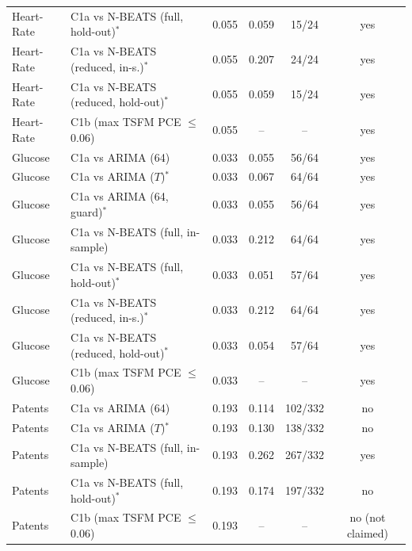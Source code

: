 \begin{tabular}{llcccc}
Heart-Rate & C1a vs N-BEATS (full, hold-out)$^\ast$ & 0.055 & 0.059 & 15/24 & yes \\
Heart-Rate & C1a vs N-BEATS (reduced, in-s.)$^\ast$ & 0.055 & 0.207 & 24/24 & yes \\
Heart-Rate & C1a vs N-BEATS (reduced, hold-out)$^\ast$ & 0.055 & 0.059 & 15/24 & yes \\
Heart-Rate & C1b (max TSFM PCE $\le$ 0.06) & 0.055 & -- & -- & yes \\
Glucose & C1a vs ARIMA (64) & 0.033 & 0.055 & 56/64 & yes \\
Glucose & C1a vs ARIMA ($T$)$^\ast$ & 0.033 & 0.067 & 64/64 & yes \\
Glucose & C1a vs ARIMA (64, guard)$^\ast$ & 0.033 & 0.055 & 56/64 & yes \\
Glucose & C1a vs N-BEATS (full, in-sample) & 0.033 & 0.212 & 64/64 & yes \\
Glucose & C1a vs N-BEATS (full, hold-out)$^\ast$ & 0.033 & 0.051 & 57/64 & yes \\
Glucose & C1a vs N-BEATS (reduced, in-s.)$^\ast$ & 0.033 & 0.212 & 64/64 & yes \\
Glucose & C1a vs N-BEATS (reduced, hold-out)$^\ast$ & 0.033 & 0.054 & 57/64 & yes \\
Glucose & C1b (max TSFM PCE $\le$ 0.06) & 0.033 & -- & -- & yes \\
Patents & C1a vs ARIMA (64) & 0.193 & 0.114 & 102/332 & no \\
Patents & C1a vs ARIMA ($T$)$^\ast$ & 0.193 & 0.130 & 138/332 & no \\
Patents & C1a vs N-BEATS (full, in-sample) & 0.193 & 0.262 & 267/332 & yes \\
Patents & C1a vs N-BEATS (full, hold-out)$^\ast$ & 0.193 & 0.174 & 197/332 & no \\
Patents & C1b (max TSFM PCE $\le$ 0.06) & 0.193 & -- & -- & no (not claimed) \\
\bottomrule
\end{tabular}
